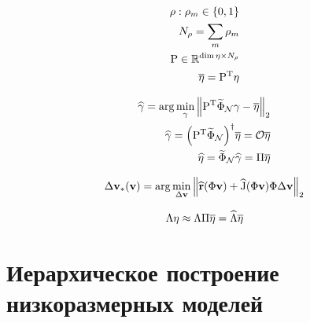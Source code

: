 \begin{align}
   \bvec{\rho} : \rho_m \in \left\{0, 1 \right\} \\
   N_{\bvec{\rho}} = \sum_m \rho_m \\
   \matr{P} \in \mathbb{R}^{\dim{\nlin} \times N_{\bvec{\rho}}} \\
   \overline{\nlin} = \transpose{P} \nlin
\end{align}

\begin{align}
    \widehat{\bvec{\gamma}} = \arg \min_{\bvec{\gamma}} \norm[2]{\transpose{P} \widetilde{\Phi}_\mathcal{N} \bvec{\gamma} - \overline{\nlin}} \\
    \widehat{\bvec{\gamma}} = {\left( \transpose{P} \widetilde{\Phi}_\mathcal{N} \right)}^\dagger \overline{\nlin} = \mathcal{O} \overline{\nlin} \\
    \widehat{\nlin} = \widetilde{\Phi}_\mathcal{N} \widehat{\bvec{\gamma}} = \matr{\Pi} \overline{\nlin}
\end{align}


\begin{align}
    \dvunk_\ast (\vunk)= \arg \min_{\dvunk} \norm[2]{\widehat{\resid}(\Phi \vunk) + \widehat{\jac}(\Phi \vunk) \Phi \dvunk}
\end{align}

\begin{align}
    \matr{\Lambda} \nlin \approx
    \matr{\Lambda} \matr{\Pi} \overline{\nlin} = \widehat{\matr{\Lambda}} \overline{\nlin}
\end{align}

\section{Иерархическое построение низкоразмерных моделей}

